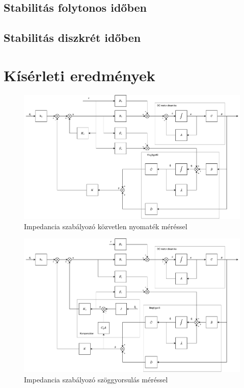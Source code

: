 \section{Stabilitás folytonos időben}

\section{Stabilitás diszkrét időben}

\chapter{Kísérleti eredmények}\label{chap:experimental_results}

\begin{figure}[ht]
\begin{center}
\includegraphics[width=\textwidth]{images/compensated_position_control_torque.drawio.pdf}
\caption{Impedancia szabályozó közvetlen nyomaték méréssel}
\end{center}
\end{figure}

\begin{figure}[ht]
\begin{center}
\includegraphics[width=\textwidth]{images/compensated_position_controller_angular_acceleration.pdf}
\caption{Impedancia szabályozó szöggyorsulás méréssel}
\end{center}
\end{figure}

